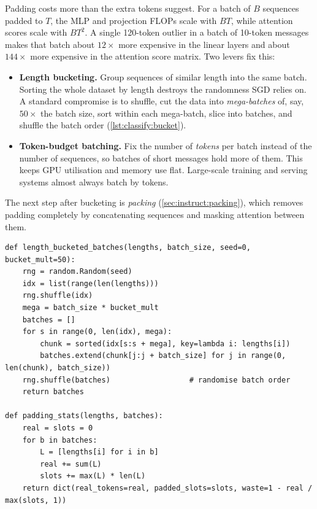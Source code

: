 \begin{systemslens}
Padding costs more than the extra tokens suggest. For a batch of $B$ sequences padded to
$T$, the MLP and projection FLOPs scale with $BT$, while attention scores scale with
$BT^2$. A single 120-token outlier in a batch of 10-token messages makes that batch
about $12\times$ more expensive in the linear layers and about $144\times$ more
expensive in the attention score matrix. Two levers fix this:
\begin{itemize}
\item \textbf{Length bucketing.} Group sequences of similar length into the same batch.
Sorting the whole dataset by length destroys the randomness SGD relies on. A standard
compromise is to shuffle, cut the data into \emph{mega-batches} of, say,
$50\times$ the batch size, sort within each mega-batch, slice into batches, and shuffle
the batch order (\cref{lst:classify:bucket}).
\item \textbf{Token-budget batching.} Fix the number of \emph{tokens} per batch
instead of the number of sequences, so batches of short messages hold more of them.
This keeps GPU utilisation and memory use flat. Large-scale training and serving
systems almost always batch by tokens.
\end{itemize}
The next step after bucketing is \emph{packing} (\cref{sec:instruct:packing}), which
removes padding completely by concatenating sequences and masking attention between
them.
\end{systemslens}

\begin{lstlisting}[caption={Sort-within-mega-batch bucketing and a padding-waste meter.},label={lst:classify:bucket}]
def length_bucketed_batches(lengths, batch_size, seed=0, bucket_mult=50):
    rng = random.Random(seed)
    idx = list(range(len(lengths)))
    rng.shuffle(idx)
    mega = batch_size * bucket_mult
    batches = []
    for s in range(0, len(idx), mega):
        chunk = sorted(idx[s:s + mega], key=lambda i: lengths[i])
        batches.extend(chunk[j:j + batch_size] for j in range(0, len(chunk), batch_size))
    rng.shuffle(batches)                  # randomise batch order
    return batches

def padding_stats(lengths, batches):
    real = slots = 0
    for b in batches:
        L = [lengths[i] for i in b]
        real += sum(L)
        slots += max(L) * len(L)
    return dict(real_tokens=real, padded_slots=slots, waste=1 - real / max(slots, 1))
\end{lstlisting}

